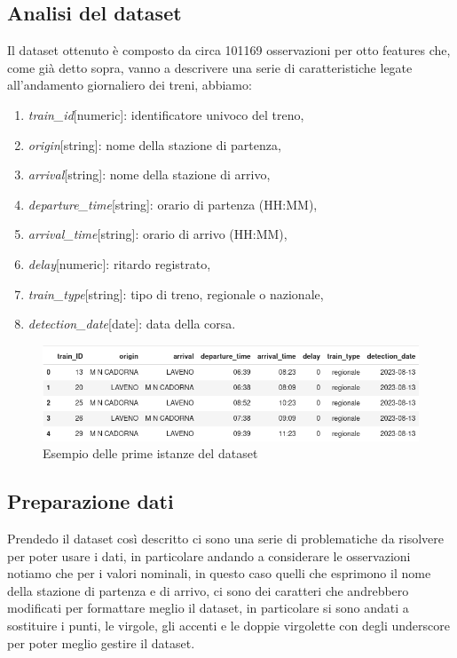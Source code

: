 \documentclass[italian,12pt,a4paper]{article}
\begin{document}
	\subsection{Analisi del dataset}
		Il dataset ottenuto è composto da circa 101169 osservazioni per otto features che, come già detto sopra, vanno a descrivere una serie di caratteristiche legate all'andamento giornaliero dei treni, abbiamo:
		
		\begin{enumerate}
			\item \textit{train\_id}[numeric]: identificatore univoco del treno,
			\item \textit{origin}[string]: nome della stazione di partenza,
			\item \textit{arrival}[string]: nome della stazione di arrivo,
			\item \textit{departure\_time}[string]: orario di partenza (HH:MM),
			\item \textit{arrival\_time}[string]: orario di arrivo (HH:MM),
			\item \textit{delay}[numeric]: ritardo registrato,
			\item \textit{train\_type}[string]: tipo di treno, regionale o nazionale,
			\item \textit{detection\_date}[date]: data della corsa.
		\end{enumerate}
		
			\begin{figure}[!h]
				\centering
				\includegraphics[width=1.1\linewidth]{img/dataset}
				\caption{Esempio delle prime istanze del dataset}
			\end{figure}
	

	\subsection{Preparazione dati}
		Prendedo il dataset così descritto ci sono una serie di problematiche da risolvere per poter usare i dati, in particolare andando a considerare le osservazioni notiamo che per i valori nominali, in questo caso quelli che esprimono il nome della stazione di partenza e di arrivo, ci sono dei caratteri che andrebbero modificati per formattare meglio il dataset, in particolare si sono andati a sostituire i punti, le virgole, gli accenti e le doppie virgolette con degli underscore per poter meglio gestire il dataset.
		
\end{document}
